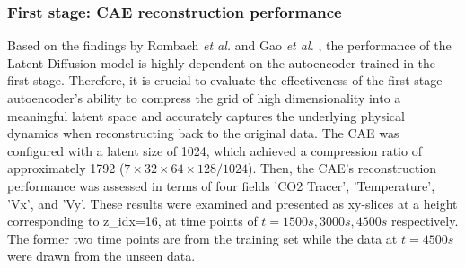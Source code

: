 \documentclass[final-report]{article-template}
\begin{document}
\subsubsection{First stage: CAE reconstruction performance}
Based on the findings by Rombach \textit{et al.} \cite{rombach2022highresolution} and Gao \textit{et al.} \cite{gao2024prediff}, the performance of the Latent Diffusion model is highly dependent on the autoencoder trained in the first stage. Therefore, it is crucial to evaluate the effectiveness of the first-stage autoencoder's ability to compress the grid of high dimensionality into a meaningful latent space and accurately captures the underlying physical dynamics when reconstructing back to the original data. The CAE was configured with a latent size of 1024, which achieved a compression ratio of approximately 1792 ($7 \times 32 \times 64 \times 128 / 1024$). Then, the CAE's reconstruction performance was assessed in terms of four fields 'CO2 Tracer', 'Temperature', 'Vx', and 'Vy'. These results were examined and presented as xy-slices at a height corresponding to z\_idx=16, at time points of $t = 1500s, 3000s, 4500s$ respectively. The former two time points are from the training set while the data at $t = 4500s$ were drawn from the unseen data.\\
\end{document}
